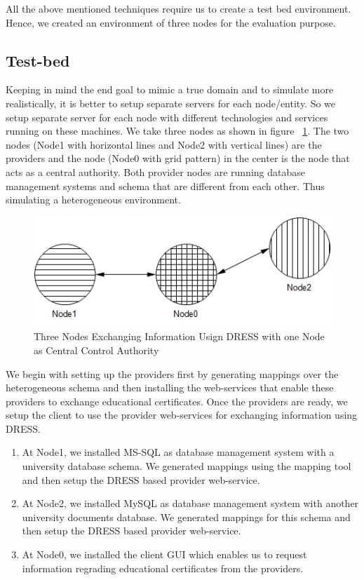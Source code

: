 \documentclass[12pt,a4paper,oneside]{book}
\begin{document}
	All the above mentioned techniques require us to create a test bed environment. Hence, we created an environment of three nodes for the evaluation purpose. \\
	
	\subsection{Test-bed}
	Keeping in mind the end goal to mimic a true domain and to simulate more realistically, it is better to setup separate servers for each node/entity. So we setup separate server for each node with different technologies and services running on these machines. We take three nodes as shown in figure ~\ref{fig:testbed}. The two nodes (Node1 with horizontal lines and Node2 with vertical lines) are the providers and the node (Node0 with grid pattern) in the center is the node that acts as a central authority. Both provider nodes are running database management systems and schema that are different from each other. Thus simulating a heterogeneous environment.
	
\begin{figure}[!htp]
  \centering
  \includegraphics{architecture_distributed_testbed_exchange_through_hec.jpg}
  \caption{Three Nodes Exchanging Information Usign DRESS with one Node as Central Control Authority}
  \label{fig:testbed}
\end{figure}  

We begin with setting up the providers first by generating mappings over the heterogeneous schema and then installing the web-services that enable these providers to exchange educational certificates. Once the providers are ready, we setup the client to use the provider web-services for exchanging information using DRESS.

	\begin{enumerate}  

		\item At Node1, we installed MS-SQL as database management system with a university database schema. We generated mappings using the mapping tool and then setup the DRESS based provider web-service.

		\item At Node2, we installed MySQL as database management system with another university documents  database. We generated mappings for this schema and then setup the DRESS based provider web-service. 
	
		\item At Node0, we installed the client GUI which enables us to request information regrading educational certificates from the providers. 

	\end{enumerate}
	
\end{document}
